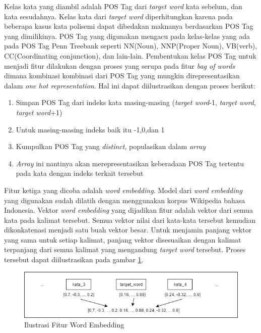 Kelas kata yang diambil adalah POS Tag dari \textit{target word} kata sebelum, dan kata sesudahnya. Kelas kata dari \textit{target word} diperhitungkan karena pada beberapa kasus kata polisemi dapat dibedakan maknanya berdasarkan POS Tag yang dimilikinya. POS Tag yang digunakan mengacu pada kelas-kelas yang ada pada POS Tag Penn Treebank seperti NN(Noun), NNP(Proper Noun), VB(verb), CC(Coordinating conjunction), dan lain-lain. Pembentukan kelas POS Tag untuk menjadi fitur dilakukan dengan proses yang serupa pada fitur \textit{bag of words} dimana kombinasi kombinasi dari POS Tag yang mungkin direpresentasikan dalam \textit{one hot representation}. Hal ini dapat diilustrasikan dengan proses berikut:

\begin{enumerate}
	\item Simpan POS Tag dari indeks kata masing-masing (\textit{target word}-1, \textit{target word}, \textit{target word}+1)
	\item Untuk masing-masing indeks baik itu -1,0,dan 1
	\item Kumpulkan POS Tag yang \textit{distinct}, populasikan dalam \textit{array}
	\item \textit{Array} ini nantinya akan merepresentasikan keberadaan POS Tag tertentu pada kata dengan indeks terkait tersebut
\end{enumerate}

Fitur ketiga yang dicoba adalah \textit{word embedding}. Model dari \textit{word embedding} yang digunakan sudah dilatih dengan menggunakan korpus Wikipedia bahasa Indonesia. Vektor \textit{word embedding} yang dijadikan fitur adalah vektor dari semua kata pada kalimat tersebut. Semua vektor nilai dari kata-kata tersebut kemudian dikonkatenasi menjadi satu buah vektor besar. Untuk menjamin panjang vektor yang sama untuk setiap kalimat, panjang vektor disesuaikan dengan kalimat terpanjang dari semua kalimat yang mengandung \textit{target word} tersebut. Proses tersebut dapat diilustrasikan pada gambar \ref{fig:Ilustrasi-Fitur-Word-Embedding}.
\begin{figure}
	\centering
	\includegraphics[width=1\linewidth]{adit_pics/we-vector}
	\caption{Ilustrasi Fitur Word Embedding}
	\label{fig:Ilustrasi-Fitur-Word-Embedding}
\end{figure}

